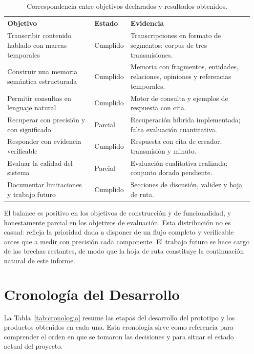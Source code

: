 \documentclass[12pt,a4paper]{article}
\begin{document}
\begin{table}[h]
\centering
\small
\begin{tabular}{@{}p{5.6cm}p{2.6cm}p{6.2cm}@{}}
\toprule
\textbf{Objetivo} & \textbf{Estado} & \textbf{Evidencia} \\
\midrule
Transcribir contenido hablado con marcas temporales & Cumplido & Transcripciones en formato de segmentos; corpus de tres transmisiones. \\
Construir una memoria semántica estructurada & Cumplido & Memoria con fragmentos, entidades, relaciones, opiniones y referencias temporales. \\
Permitir consultas en lenguaje natural & Cumplido & Motor de consulta y ejemplos de respuesta con cita. \\
Recuperar con precisión y con significado & Parcial & Recuperación híbrida implementada; falta evaluación cuantitativa. \\
Responder con evidencia verificable & Cumplido & Respuesta con cita de creador, transmisión y minuto. \\
Evaluar la calidad del sistema & Parcial & Evaluación cualitativa realizada; conjunto dorado pendiente. \\
Documentar limitaciones y trabajo futuro & Cumplido & Secciones de discusión, validez y hoja de ruta. \\
\bottomrule
\end{tabular}
\caption{Correspondencia entre objetivos declarados y resultados obtenidos.}
\label{tab:objetivos}
\end{table}

El balance es positivo en los objetivos de construcción y de funcionalidad, y honestamente parcial en los objetivos de evaluación. Esta distribución no es casual: refleja la prioridad dada a disponer de un flujo completo y verificable antes que a medir con precisión cada componente. El trabajo futuro se hace cargo de las brechas restantes, de modo que la hoja de ruta constituye la continuación natural de este informe.



\section{Cronología del Desarrollo}
\label{anexo:cronologia}

La Tabla~\ref{tab:cronologia} resume las etapas del desarrollo del prototipo y los productos obtenidos en cada una. Esta cronología sirve como referencia para comprender el orden en que se tomaron las decisiones y para situar el estado actual del proyecto.
\end{document}
